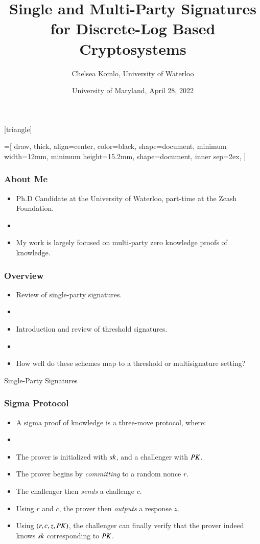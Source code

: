 \documentclass[hyperref={pdfpagelabels=true},table,dvipsnames,14pt,aspectratio=169]{beamer}
\title[Signatures for Discrete Logarithm Based Cryptosystems]{Single and Multi-Party Signatures for Discrete-Log Based Cryptosystems}
\author{Chelsea Komlo, University of Waterloo}
\date[April 2022]{ University of Maryland, April 28, 2022}
\begin{document}
[triangle]

=[%
draw,
thick,
align=center,
color=black,
shape=document,
minimum width=12mm,
minimum height=15.2mm,
shape=document,
inner sep=2ex,
]

\begin{frame}
        \thispagestyle{empty}
        \maketitle
\end{frame}

\begin{frame}
  \frametitle{About Me}

  \begin{itemize}
    \item<1-> Ph.D Candidate at the University of Waterloo, part-time at the Zcash Foundation. 
    \item[]
    \item<1-> My work is largely focused on multi-party zero knowledge proofs of knowledge. 
  \end{itemize}
\end{frame}

\begin{frame}
  \frametitle{Overview}

  \begin{itemize}
    \item<1-> Review of single-party signatures.
    \item[]
    \item<2-> Introduction and review of threshold signatures. 
    \item[]
    \item<3-> How well do these schemes map to a threshold or multisignature setting? 
  \end{itemize}
\end{frame}

\begin{frame}
  \huge 
  Single-Party Signatures 
\end{frame}

\begin{frame}
  \frametitle{Sigma Protocol}

  \begin{itemize}
    \item<1-> A sigma proof of knowledge is a three-move protocol, where:
    \item[]
    \item<2->[1.] The prover is initialized with $\mathit{sk}$, and a challenger with $\mathit{PK}$. 
    \item<3->[2.] The prover begins by \emph{committing} to a random nonce $r$. 
    \item<4->[3.] The challenger then \emph{sends} a challenge $c$. 
    \item<5->[4.] Using $r$ and $c$, the prover then \emph{outputs} a response $z$. 
    \item<6->[5.] Using $(r, c,z, \mathit{PK})$, the challenger can finally verify that the prover indeed knows $\mathit{sk}$ corresponding to $\mathit{PK}$.
  \end{itemize}
\end{frame}
\end{document}
